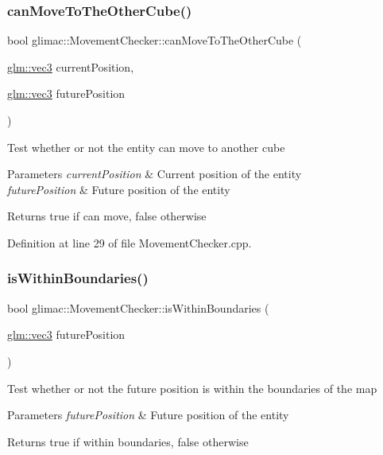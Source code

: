 \subsubsection{\texorpdfstring{can\+Move\+To\+The\+Other\+Cube()}{canMoveToTheOtherCube()}}
{\footnotesize\ttfamily bool glimac\+::\+Movement\+Checker\+::can\+Move\+To\+The\+Other\+Cube (\begin{DoxyParamCaption}\item[{\hyperlink{group__core__types_ga1c47e8b3386109bc992b6c48e91b0be7}{glm\+::vec3}}]{current\+Position,  }\item[{\hyperlink{group__core__types_ga1c47e8b3386109bc992b6c48e91b0be7}{glm\+::vec3}}]{future\+Position }\end{DoxyParamCaption})}

Test whether or not the entity can move to another cube 
\begin{DoxyParams}{Parameters}
{\em current\+Position} & Current position of the entity \\
\hline
{\em future\+Position} & Future position of the entity \\
\hline
\end{DoxyParams}
\begin{DoxyReturn}{Returns}
true if can move, false otherwise 
\end{DoxyReturn}


Definition at line 29 of file Movement\+Checker.\+cpp.

\mbox{\label{classglimac_1_1_movement_checker_a6071f115812fb9ee54e71b6fb64ace2b}} 
\subsubsection{\texorpdfstring{is\+Within\+Boundaries()}{isWithinBoundaries()}}
{\footnotesize\ttfamily bool glimac\+::\+Movement\+Checker\+::is\+Within\+Boundaries (\begin{DoxyParamCaption}\item[{\hyperlink{group__core__types_ga1c47e8b3386109bc992b6c48e91b0be7}{glm\+::vec3}}]{future\+Position }\end{DoxyParamCaption})}

Test whether or not the future position is within the boundaries of the map 
\begin{DoxyParams}{Parameters}
{\em future\+Position} & Future position of the entity \\
\hline
\end{DoxyParams}
\begin{DoxyReturn}{Returns}
true if within boundaries, false otherwise 
\end{DoxyReturn}


